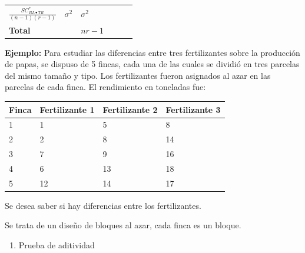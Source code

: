 \documentclass[]{book}
\providecommand{\tightlist}{%
  \setlength{\itemsep}{0pt}\setlength{\parskip}{0pt}}
\theoremstyle{definition}
\theoremstyle{definition}
\theoremstyle{definition}
\theoremstyle{remark}
\begin{document}
\begin{longtable}[]{@{}llllll@{}}
\begin{minipage}[t]{0.18\columnwidth}
\(\frac{SC_{BL \bullet TR}^{*}}{\left( n - 1 \right)\left( r - 1 \right)}\)\strut
\end{minipage} & \begin{minipage}[t]{0.17\columnwidth}\raggedright
\(\sigma^{2}\)\strut
\end{minipage} & \begin{minipage}[t]{0.17\columnwidth}\raggedright
\(\sigma^{2}\)\strut
\end{minipage}\tabularnewline
\begin{minipage}[t]{0.03\columnwidth}\raggedright
\textbf{Total}\strut
\end{minipage} & \begin{minipage}[t]{0.26\columnwidth}\raggedright
\strut
\end{minipage} & \begin{minipage}[t]{0.04\columnwidth}\raggedright
\(nr - 1\)\strut
\end{minipage} & \begin{minipage}[t]{0.18\columnwidth}\raggedright
\strut
\end{minipage} & \begin{minipage}[t]{0.17\columnwidth}\raggedright
\strut
\end{minipage} & \begin{minipage}[t]{0.17\columnwidth}\raggedright
\strut
\end{minipage}\tabularnewline
\bottomrule
\end{longtable}

\textbf{Ejemplo:} Para estudiar las diferencias entre tres fertilizantes
sobre la producción de papas, se dispuso de 5 fincas, cada una de las
cuales se dividió en tres parcelas del mismo tamaño y tipo. Los
fertilizantes fueron asignados al azar en las parcelas de cada finca. El
rendimiento en toneladas fue:

\begin{longtable}[]{@{}llll@{}}
\toprule
Finca & Fertilizante 1 & Fertilizante 2 & Fertilizante 3\tabularnewline
\midrule
\endhead
1 & 1 & 5 & 8\tabularnewline
2 & 2 & 8 & 14\tabularnewline
3 & 7 & 9 & 16\tabularnewline
4 & 6 & 13 & 18\tabularnewline
5 & 12 & 14 & 17\tabularnewline
\bottomrule
\end{longtable}

Se desea saber si hay diferencias entre los fertilizantes.

Se trata de un diseño de bloques al azar, cada finca es un bloque.

\begin{enumerate}
\def\labelenumi{\arabic{enumi}.}
\tightlist
\item
  Prueba de aditividad
\end{enumerate}
\end{document}
